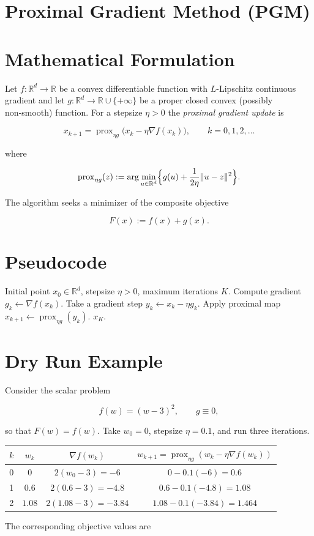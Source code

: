 \documentclass{article}
\newcommand{\prox}{\operatorname{prox}}
\newcommand{\R}{\mathbb{R}}
\begin{document}
\section*{Proximal Gradient Method (PGM)}

\section*{Mathematical Formulation}
Let $f:\R^{d}\rightarrow\R$ be a convex differentiable function with $L$-Lipschitz continuous gradient and let $g:\R^{d}\rightarrow\R\cup\{+\infty\}$ be a proper closed convex (possibly non‑smooth) function.  
For a stepsize $\eta>0$ the \emph{proximal gradient update} is  

\[
\boxed{
x_{k+1}= \prox_{\eta g}\bigl(x_{k}-\eta \nabla f(x_{k})\bigr)},
\qquad k=0,1,2,\dots
\]

where  

\[
\prox_{\eta g}(z):=\arg\min_{u\in\R^{d}}\Bigl\{g(u)+\frac{1}{2\eta}\|u-z\|^{2}\Bigr\}.
\]

The algorithm seeks a minimizer of the composite objective  

\[
F(x):=f(x)+g(x).
\]

\section*{Pseudocode}
\begin{algorithm}[H]
\caption{Proximal Gradient Method}
\begin{algorithmic}[1]
\REQUIRE Initial point $x_{0}\in\R^{d}$, stepsize $\eta>0$, maximum iterations $K$.
    \STATE Compute gradient $g_{k}\gets\nabla f(x_{k})$.
    \STATE Take a gradient step $y_{k}\gets x_{k}-\eta g_{k}$.
    \STATE Apply proximal map $x_{k+1}\gets \prox_{\eta g}(y_{k})$.
\ENDFOR
\RETURN $x_{K}$.
\end{algorithmic}
\end{algorithm}

\section*{Dry Run Example}
Consider the scalar problem  

\[
f(w)=(w-3)^{2},\qquad g\equiv0,
\]

so that $F(w)=f(w)$.  
Take $w_{0}=0$, stepsize $\eta=0.1$, and run three iterations.

\begin{center}
\begin{tabular}{c|c|c|c}
$k$ & $w_{k}$ & $\nabla f(w_{k})$ & $w_{k+1}= \prox_{\eta g}(w_{k}-\eta\nabla f(w_{k}))$ \\ \hline
0 & $0$ & $2(w_{0}-3)=-6$ & $0-0.1(-6)=0.6$ \\
1 & $0.6$ & $2(0.6-3)=-4.8$ & $0.6-0.1(-4.8)=1.08$ \\
2 & $1.08$ & $2(1.08-3)=-3.84$ & $1.08-0.1(-3.84)=1.464$ \\ \hline
\end{tabular}
\end{center}
The corresponding objective values are  
\end{document}

